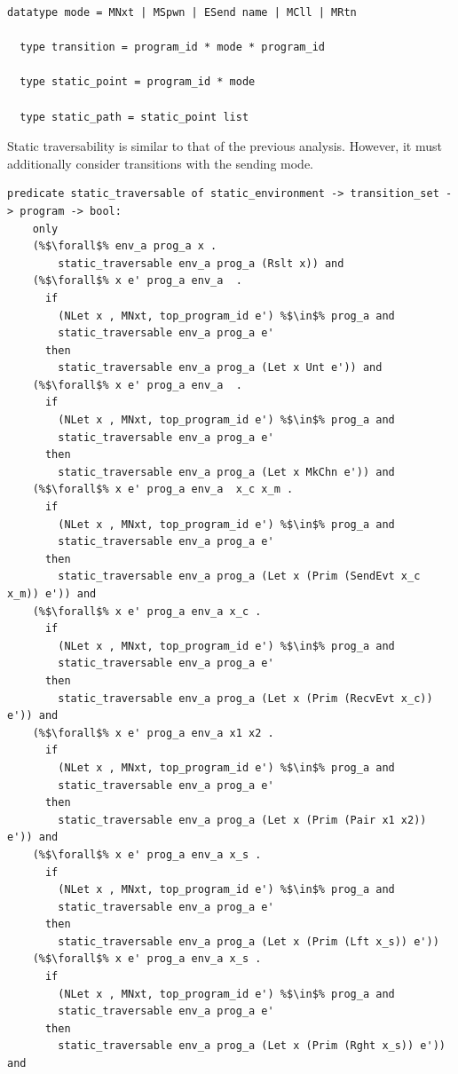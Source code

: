 \documentclass{article}
\begin{document}
\begin{lstlisting}[language=logic, escapechar=\%]
  datatype mode = MNxt | MSpwn | ESend name | MCll | MRtn

  type transition = program_id * mode * program_id

  type static_point = program_id * mode

  type static_path = static_point list
\end{lstlisting}

Static traversability is similar to that of the previous analysis.
However, it must additionally consider transitions with the sending mode. 

\begin{lstlisting}[language=logic, escapechar=\%]
  predicate static_traversable of static_environment -> transition_set -> program -> bool:
    only
    (%$\forall$% env_a prog_a x .
        static_traversable env_a prog_a (Rslt x)) and
    (%$\forall$% x e' prog_a env_a  .
      if
        (NLet x , MNxt, top_program_id e') %$\in$% prog_a and
        static_traversable env_a prog_a e'
      then
        static_traversable env_a prog_a (Let x Unt e')) and
    (%$\forall$% x e' prog_a env_a  .
      if
        (NLet x , MNxt, top_program_id e') %$\in$% prog_a and
        static_traversable env_a prog_a e'
      then
        static_traversable env_a prog_a (Let x MkChn e')) and
    (%$\forall$% x e' prog_a env_a  x_c x_m .
      if
        (NLet x , MNxt, top_program_id e') %$\in$% prog_a and
        static_traversable env_a prog_a e'
      then
        static_traversable env_a prog_a (Let x (Prim (SendEvt x_c x_m)) e')) and
    (%$\forall$% x e' prog_a env_a x_c .
      if
        (NLet x , MNxt, top_program_id e') %$\in$% prog_a and
        static_traversable env_a prog_a e'
      then
        static_traversable env_a prog_a (Let x (Prim (RecvEvt x_c)) e')) and
    (%$\forall$% x e' prog_a env_a x1 x2 .
      if
        (NLet x , MNxt, top_program_id e') %$\in$% prog_a and
        static_traversable env_a prog_a e'
      then
        static_traversable env_a prog_a (Let x (Prim (Pair x1 x2)) e')) and
    (%$\forall$% x e' prog_a env_a x_s .
      if
        (NLet x , MNxt, top_program_id e') %$\in$% prog_a and
        static_traversable env_a prog_a e'
      then
        static_traversable env_a prog_a (Let x (Prim (Lft x_s)) e'))
    (%$\forall$% x e' prog_a env_a x_s .
      if
        (NLet x , MNxt, top_program_id e') %$\in$% prog_a and
        static_traversable env_a prog_a e'
      then
        static_traversable env_a prog_a (Let x (Prim (Rght x_s)) e')) and

\end{lstlisting}
\end{document}
